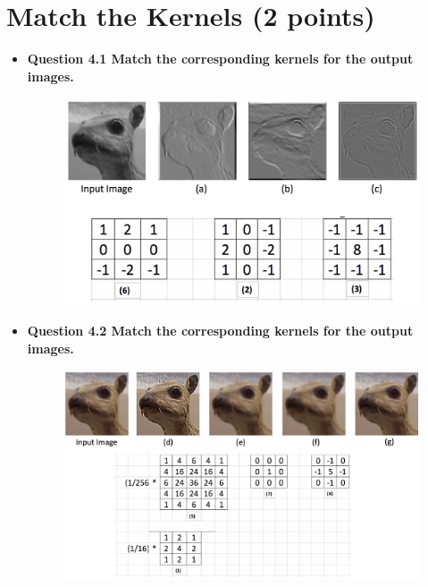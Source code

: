 \section{Match the Kernels (2 points)}
\begin{itemize}
\item \textbf{Question 4.1 Match the corresponding kernels for the output images.} 

\begin{figure}[h!]
\centering
\includegraphics[width=\textwidth]{grayscale_conv.png}
\end{figure}



\item  \textbf{Question 4.2 Match the corresponding kernels for the output images.} 

\begin{figure}[h!]
\centering
\includegraphics[width=\textwidth]{rgb_conv.png}
\end{figure}

\end{itemize}

